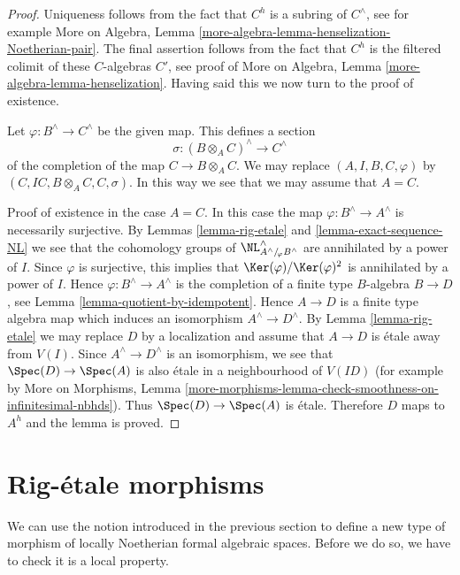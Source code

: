 \begin{proof}
Uniqueness follows from the fact that $C^h$ is a subring of
$C^\wedge$, see for example
More on Algebra, Lemma \ref{more-algebra-lemma-henselization-Noetherian-pair}.
The final assertion follows from the fact that $C^h$ is the filtered colimit
of these $C$-algebras $C'$, see proof of
More on Algebra, Lemma \ref{more-algebra-lemma-henselization}.
Having said this we now turn to the proof of existence.

\medskip\noindent
Let $\varphi : B^\wedge \to C^\wedge$ be the given map.
This defines a section
$$
\sigma : (B \otimes_A C)^\wedge \longrightarrow C^\wedge
$$
of the completion of the map $C \to B \otimes_A C$. We may
replace $(A, I, B, C, \varphi)$ by $(C, IC, B \otimes_A C, C, \sigma)$.
In this way we see that we may assume that $A = C$.

\medskip\noindent
Proof of existence in the case $A = C$. In this case the map
$\varphi : B^\wedge \to A^\wedge$ is necessarily surjective.
By Lemmas \ref{lemma-rig-etale} and \ref{lemma-exact-sequence-NL}
we see that the cohomology groups of
$\NL^\wedge_{A^\wedge/\!_\varphi B^\wedge}$
are annihilated by a power of $I$. Since $\varphi$ is surjective,
this implies that $\Ker(\varphi)/\Ker(\varphi)^2$ is annihilated
by a power of $I$. Hence $\varphi : B^\wedge \to A^\wedge$
is the completion of a finite type $B$-algebra $B \to D$, see
Lemma \ref{lemma-quotient-by-idempotent}. Hence $A \to D$ is
a finite type algebra map which induces an isomorphism
$A^\wedge \to D^\wedge$. By
Lemma \ref{lemma-rig-etale} we may replace $D$ by a localization
and assume that $A \to D$ is \'etale away from $V(I)$.
Since $A^\wedge \to D^\wedge$ is an isomorphism, we see that
$\Spec(D) \to \Spec(A)$ is also \'etale in a neighbourhood of $V(ID)$
(for example by
More on Morphisms, Lemma
\ref{more-morphisms-lemma-check-smoothness-on-infinitesimal-nbhds}).
Thus $\Spec(D) \to \Spec(A)$ is \'etale. Therefore $D$ maps to
$A^h$ and the lemma is proved.
\end{proof}






\section{Rig-\'etale morphisms}
\label{section-rig-etale-morphisms}

\noindent
We can use the notion introduced in the previous section to define
a new type of morphism of locally Noetherian formal algebraic spaces.
Before we do so, we have to check it is a local property.

